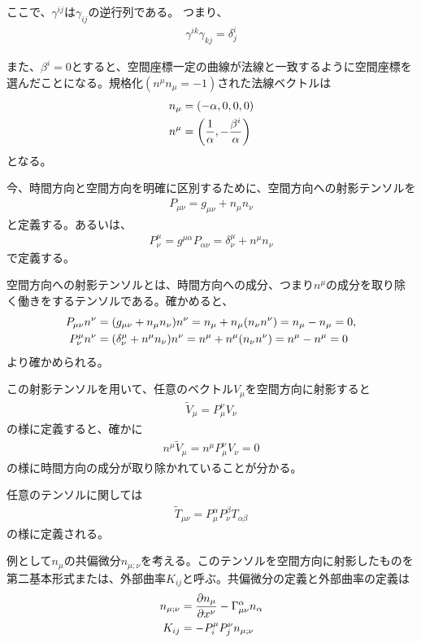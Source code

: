 \documentclass[autodetect-engine,dvi=dvipdfmx,ja=standard, 10pt, a4paper]{bxjsarticle}
\begin{document}
ここで、$\gamma^{ij}$は$\gamma_{ij}$の逆行列である。
つまり、
\begin{align}
	\gamma^{ik}\gamma_{kj} = \delta^i_j
\end{align}

また、$\beta^i =0$とすると、空間座標一定の曲線が法線と一致するように空間座標を選んだことになる。規格化$(n^\mu n_\mu=-1)$された法線ベクトルは
\begin{align}
	n_\mu &= (-\alpha, 0, 0, 0)\label{eq:nmudown}\\
  n^\mu &= \qty(\dfrac{1}{\alpha}, -\dfrac{\beta^i}{\alpha})\label{eq:nmuup}
\end{align}
となる。

今、時間方向と空間方向を明確に区別するために、空間方向への射影テンソルを
\begin{align}
	P_{\mu\nu} = g_{\mu\nu} + n_\mu n_\nu\label{1}
\end{align}
と定義する。あるいは、
\begin{align}
	P^\mu_\nu = g^{\mu\alpha}P_{\alpha\nu} = \delta^\mu_\nu + n^\mu n_\nu
\end{align}
で定義する。

空間方向への射影テンソルとは、時間方向への成分、つまり$n^\mu$の成分を取り除く働きをするテンソルである。確かめると、
\begin{align}
	P_{\mu\nu}n^\nu &= \qty(g_{\mu\nu} + n_\mu n_\nu)n^\nu = n_\mu + n_\mu (n_\nu n^\nu) = n_\mu - n_\mu = 0,
	\label{eq:kuukan_zikan}\\
	P^\mu_\nu n^\nu &= \qty(\delta^\mu_\nu + n^\mu n_\nu)n^\nu = n^\mu + n^\mu (n_\nu n^\nu) = n^\mu - n^\mu = 0  \label{eq:kuukan_zikan_up}
\end{align}
より確かめられる。

この射影テンソルを用いて、任意のベクトル$V_\mu$を空間方向に射影すると
\begin{align}
	\tilde{V}_\mu = P_\mu^\nu V_\nu
\end{align}
の様に定義すると、確かに
\begin{align}
	n^\mu \tilde{V}_\mu = n^\mu P_\mu^\nu V_\nu = 0
\end{align}
の様に時間方向の成分が取り除かれていることが分かる。

任意のテンソルに関しては
\begin{align}
	\tilde{T}_{\mu\nu} = P_\mu^\alpha P_\nu^\beta T_{\alpha\beta}
\end{align}
の様に定義される。

例として$n_\mu$の共偏微分$n_{\mu;\nu}$を考える。このテンソルを空間方向に射影したものを第二基本形式または、外部曲率$K_{ij}$と呼ぶ。共偏微分の定義と外部曲率の定義は
\begin{align}
	n_{\mu;\nu} &= \pdv{n_\mu}{x^\nu} - \Gamma^\alpha_{\mu\nu}n_\alpha\\
	K_{ij} &= - P_i^\mu P_j^\nu n_{\mu;\nu}
\end{align}
\end{document}
